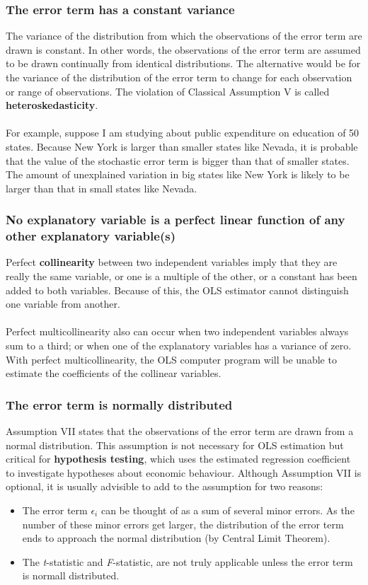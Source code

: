 \documentclass[11pt]{article}
\begin{document}
\subsubsection{The error term has a constant variance}
The variance of the distribution from which the observations of the error term are drawn is constant. In other words, the observations of the error term are assumed to be drawn continually from identical distributions. The alternative would be for the variance of the distribution of the error term to change for each observation or range of observations. The violation of Classical Assumption V is called \textbf{heteroskedasticity}.\\ \\
For example, suppose I am studying about public expenditure on education of 50 states. Because New York is larger than smaller states like Nevada, it is probable that the value of the stochastic error term is bigger than that of smaller states. The amount of unexplained variation in big states like New York is likely to be larger than that in small states like Nevada.
\subsubsection{No explanatory variable is a perfect linear function of any other explanatory variable(s)}
Perfect \textbf{collinearity} between two independent variables imply that they are really the same variable, or one is a multiple of the other, or a constant has been added to both variables. Because of this, the OLS estimator cannot distinguish one variable from another.\\ \\
Perfect multicollinearity also can occur when two independent variables always sum to a third; or when one of the explanatory variables has a variance of zero. With perfect multicollinearity, the OLS computer program will be unable to estimate the coefficients of the collinear variables. 
\subsubsection{The error term is normally distributed}
Assumption VII states that the observations of the error term are drawn from a normal distribution. This assumption is not necessary for OLS estimation but critical for \textbf{hypothesis testing}, which uses the estimated regression coefficient to investigate hypotheses about economic behaviour. Although Assumption VII is optional, it is usually advisible to add to the assumption for two reasons:
\begin{itemize}
\item The error term $\epsilon_i$ can be thought of as a sum of several minor errors. As the number of these minor errors get larger, the distribution of the error term ends to approach the normal distribution (by Central Limit Theorem).
\item The \textit{t}-statistic and \textit{F}-statistic, are not truly applicable unless the error term is normall distributed.
\end{itemize}
\end{document}
